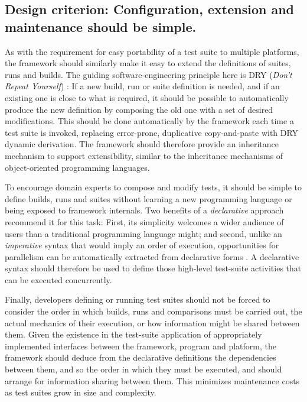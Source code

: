 \documentclass[conference]{IEEEtran}
\begin{document}
\subsection{Design criterion: Configuration, extension and maintenance should be simple.}

As with the requirement for easy portability of a test suite to multiple platforms, the framework should similarly make it easy to extend the definitions of suites, runs and builds. The guiding software-engineering principle here is DRY (\emph{Don't Repeat Yourself}) \cite{prags}: If a new build, run or suite definition is needed, and if an existing one is close to what is required, it should be possible to automatically produce the new definition by composing the old one with a set of desired modifications. This should be done automatically by the framework each time a test suite is invoked, replacing error-prone, duplicative copy-and-paste with DRY dynamic derivation. The framework should therefore provide an inheritance mechanism to support extensibility, similar to the inheritance mechanisms of object-oriented programming languages.

To encourage domain experts to compose and modify tests, it should be simple to define builds, runs and suites without learning a new programming language or being exposed to framework internals. Two benefits of a \emph{declarative} approach recommend it for this task: First, its simplicity welcomes a wider audience of users than a traditional programming language might; and second, unlike an \emph{imperative} syntax that would imply an order of execution, opportunities for parallelism can be automatically extracted from declarative forms \cite{decl-advantages}. A declarative syntax should therefore be used to define those high-level test-suite activities that can be executed concurrently.

Finally, developers defining or running test suites should not be forced to consider the order in which builds, runs and comparisons must be carried out, the actual mechanics of their execution, or how information might be shared between them. Given the existence in the test-suite application of appropriately implemented interfaces between the framework, program and platform, the framework should deduce from the declarative definitions the dependencies between them, and so the order in which they must be executed, and should arrange for information sharing between them. This minimizes maintenance costs as test suites grow in size and complexity.
\end{document}
